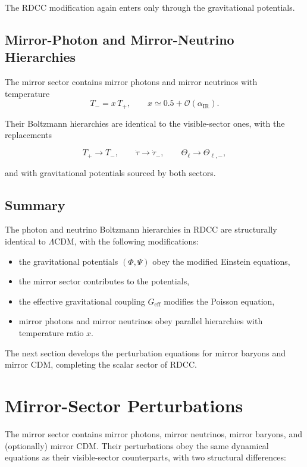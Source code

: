 \documentclass[11pt,a4paper]{article}
\begin{document}
The RDCC modification again enters only through the gravitational potentials.

\subsection{Mirror-Photon and Mirror-Neutrino Hierarchies}

The mirror sector contains mirror photons and mirror neutrinos with temperature
\begin{equation}
    T_{-} = x\,T_{+}, \qquad x \simeq 0.5 + \mathcal{O}(\alpha_{\mathrm{IR}}).
\end{equation}

Their Boltzmann hierarchies are identical to the visible-sector ones, with the replacements


\[
    T_{+} \rightarrow T_{-}, \qquad
    \dot{\tau} \rightarrow \dot{\tau}_{-}, \qquad
    \Theta_{\ell} \rightarrow \Theta_{\ell,-},
\]


and with gravitational potentials sourced by both sectors.

\subsection{Summary}

The photon and neutrino Boltzmann hierarchies in RDCC are structurally identical to
$\Lambda$CDM, with the following modifications:

\begin{itemize}
    \item the gravitational potentials $(\Phi,\Psi)$ obey the modified Einstein equations,
    \item the mirror sector contributes to the potentials,
    \item the effective gravitational coupling $G_{\mathrm{eff}}$ modifies the Poisson equation,
    \item mirror photons and mirror neutrinos obey parallel hierarchies with temperature
    ratio $x$.
\end{itemize}

The next section develops the perturbation equations for mirror baryons and mirror CDM,
completing the scalar sector of RDCC.

\section{Mirror-Sector Perturbations}

The mirror sector contains mirror photons, mirror neutrinos, mirror baryons, and (optionally)
mirror CDM. Their perturbations obey the same dynamical equations as their visible-sector
counterparts, with two structural differences:
\end{document}
